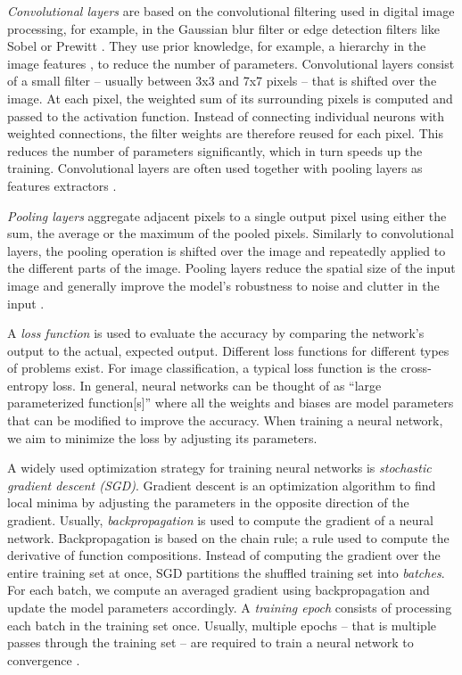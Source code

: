 \documentclass[conference,compsoc,a4paper]{IEEEtran}
\begin{document}
\emph{Convolutional layers} are based on the convolutional filtering used in digital image processing, for example, in the Gaussian blur filter or edge detection filters like Sobel or Prewitt \cite{Stockman:2001:CV:558008}.
They use prior knowledge, for example, a hierarchy in the image features \cite{lecun2010convolutional}, to reduce the number of parameters.
Convolutional layers consist of a small filter -- usually between 3x3 and 7x7 pixels -- that is shifted over the image.
At each pixel, the weighted sum of its surrounding pixels is computed and passed to the activation function.
Instead of connecting individual neurons with weighted connections, the filter weights are therefore reused for each pixel.
This reduces the number of parameters significantly, which in turn speeds up the training.
Convolutional layers are often used together with pooling layers as features extractors \cite{lecun2010convolutional}.

\emph{Pooling layers} aggregate adjacent pixels to a single output pixel using either the sum, the average or the maximum of the pooled pixels.
Similarly to convolutional layers, the pooling operation is shifted over the image and repeatedly applied to the different parts of the image.
Pooling layers reduce the spatial size of the input image and generally improve the model's robustness to noise and clutter in the input \cite{lecun2010convolutional,chilimbi2014-Project-Adam}.

A \emph{loss function} is used to evaluate the accuracy by comparing the network's output to the actual, expected output.
Different loss functions for different types of problems exist.
For image classification, a typical loss function is the cross-entropy loss.
%
In general, neural networks can be thought of as ``large parameterized function[s]'' \cite{paine2013-GPU-async-SGD} where all the weights and biases are model parameters that can be modified to improve the accuracy.
When training a neural network, we aim to minimize the loss by adjusting its parameters.

A widely used optimization strategy for training neural networks is \emph{stochastic gradient descent (SGD)}. %
Gradient descent is an optimization algorithm to find local minima by adjusting the parameters in the opposite direction of the gradient.
%
Usually, \emph{backpropagation} is used to compute the gradient of a neural network.
Backpropagation is based on the chain rule; a rule used to compute the derivative of function compositions.
%
Instead of computing the gradient over the entire training set at once, SGD partitions the shuffled training set into \emph{batches}.
For each batch, we compute an averaged gradient using backpropagation and update the model parameters accordingly.
%
A \emph{training epoch} consists of processing each batch in the training set once.
Usually, multiple epochs -- that is multiple passes through the training set -- are required to train a neural network to convergence \cite{chilimbi2014-Project-Adam}.
\end{document}
